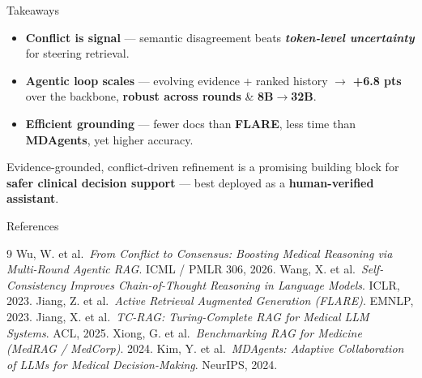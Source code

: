 \documentclass[10pt, aspectratio=169, t]{beamer}   %
\newcommand{\good}[1]{{\color{posblue}\bfseries #1}}  %
\newcommand{\warn}[1]{{\color{negmag}\bfseries #1}}   %
\newcommand{\blue}{\color{posblue}\bfseries}  %
\newcommand{\hl}{\color{posblue}\bfseries}    %
\begin{document}
\begin{frame}{Takeaways}
  \vfill
  \begin{itemize}\setlength{\itemsep}{20pt}
    \item {\large\bfseries\blue Conflict is signal} \;—\; semantic disagreement beats \warn{\emph{token-level uncertainty}} for steering retrieval.
    \item {\large\bfseries\blue Agentic loop scales} \;—\; evolving evidence + ranked history $\to$ {\hl +6.8 pts} over the backbone, \good{robust across rounds} \& \textbf{8B$\to$32B}.
    \item {\large\bfseries\blue Efficient grounding} \;—\; fewer docs than \textbf{FLARE}, less time than \textbf{MDAgents}, yet higher accuracy.
  \end{itemize}
  \vfill
  \begin{tcolorbox}[title={Medical-AI implication}]
    Evidence-grounded, conflict-driven refinement is a promising building block for \good{safer clinical decision support} --- best deployed as a {\bfseries human-verified assistant}.
  \end{tcolorbox}
  \vfill
\end{frame}

\begin{frame}{References}
  \small
  \begin{thebibliography}{9}
     Wu, W. et al.\ \emph{From Conflict to Consensus: Boosting Medical Reasoning via Multi-Round Agentic RAG}. ICML / PMLR 306, 2026.
     Wang, X. et al.\ \emph{Self-Consistency Improves Chain-of-Thought Reasoning in Language Models}. ICLR, 2023.
     Jiang, Z. et al.\ \emph{Active Retrieval Augmented Generation (FLARE)}. EMNLP, 2023.
     Jiang, X. et al.\ \emph{TC-RAG: Turing-Complete RAG for Medical LLM Systems}. ACL, 2025.
     Xiong, G. et al.\ \emph{Benchmarking RAG for Medicine (MedRAG / MedCorp)}. 2024.
     Kim, Y. et al.\ \emph{MDAgents: Adaptive Collaboration of LLMs for Medical Decision-Making}. NeurIPS, 2024.
  \end{thebibliography}
\end{frame}
\end{document}
